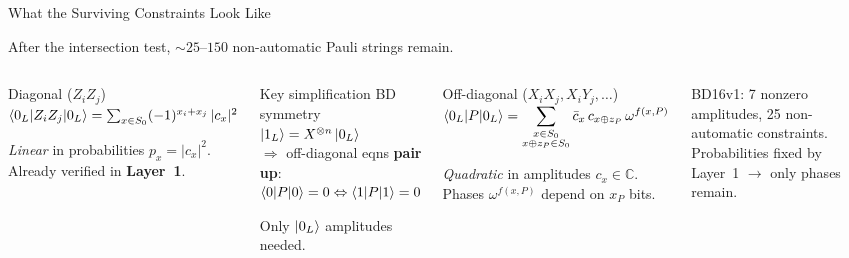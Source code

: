 \documentclass[aspectratio=169,t]{beamer}
\newcommand{\CC}{\mathbb{C}}
\begin{document}
\begin{frame}{What the Surviving Constraints Look Like}

After the intersection test, ${\sim}25$--$150$ non-automatic Pauli strings remain.

\begin{columns}[T]
\begin{block}{Diagonal ($Z_iZ_j$)}
$\braket{0_L|Z_iZ_j|0_L} = \sum_{x \in S_0} (-1)^{x_i+x_j}\,|c_x|^2$

\emph{Linear} in probabilities $p_x = |c_x|^2$.\\
Already verified in \textbf{Layer~1}.
\end{block}

\begin{exampleblock}{Key simplification}
BD symmetry $\ket{1_L} = X^{\otimes n}\ket{0_L}$\\
$\Rightarrow$ off-diagonal eqns \textbf{pair up}:\\
$\braket{0|P|0} = 0 \Leftrightarrow \braket{1|P|1} = 0$

Only $\ket{0_L}$ amplitudes needed.
\end{exampleblock}

\begin{alertblock}{Off-diagonal ($X_iX_j, X_iY_j, \ldots$)}
$\braket{0_L|P|0_L} = \displaystyle\sum_{\substack{x \in S_0 \\ x \oplus z_P \in S_0}}
  \bar{c}_x\, c_{x \oplus z_P}\, \omega^{f(x,P)}$

\emph{Quadratic} in amplitudes $c_x \in \CC$.\\
Phases $\omega^{f(x,P)}$ depend on $x_P$ bits.
\end{alertblock}

\textcolor{Slate}{\small BD16v1: 7 nonzero amplitudes, 25 non-automatic constraints. Probabilities fixed by Layer~1 $\to$ only phases remain.}
\end{columns}
\end{frame}
\end{document}

